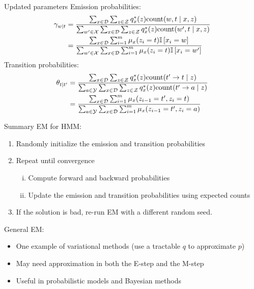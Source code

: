 \documentclass[usenames,dvipsnames,notes]{beamer}
\begin{document}
\begin{frame}
    {Updated parameters}
    Emission probabilities:
    \begin{align*}
        \gamma_{w\mid t} &= \frac{
            \sum_{x\in\mathcal{D}} \sum_{z\in\mathcal{Z}} q^*_x(z) \text{count}(w,t\mid x,z)
        }{
            \sum_{w'\in\mathcal{X}} \sum_{x\in\mathcal{D}} \sum_{z\in\mathcal{Z}} q^*_x(z) \text{count}(w',t\mid x,z)
        }\\
        &= \frac{
            \sum_{x\in\mathcal{D}} \sum_{i=1}^m \mu_x(z_i=t) \mathbb{I}\left[ x_i=w \right]
        }{
            \sum_{w'\in\mathcal{X}} \sum_{x\in\mathcal{D}} \sum_{i=1}^m \mu_x(z_i=t) \mathbb{I}\left[ x_i=w' \right]
        }
    \end{align*}
    Transition probabilities:
    \begin{align*}
        \theta_{t\mid t'} &= \frac{
            \sum_{x\in\mathcal{D}} \sum_{z\in\mathcal{Z}} q^*_x(z) \text{count}(t'\rightarrow t\mid z)
        }{
            \sum_{a\in\mathcal{Y}} \sum_{x\in\mathcal{D}} \sum_{z\in\mathcal{Z}} q^*_x(z) \text{count}(t'\rightarrow a\mid z)
        }\\
        &= \frac{
            \sum_{x\in\mathcal{D}}\sum_{i=1}^m \mu_x(z_{i-1}=t',z_i=t)
        }{
            \sum_{a\in\mathcal{Y}} \sum_{x\in\mathcal{D}}\sum_{i=1}^m \mu_x(z_{i-1}=t',z_i=a)
        }
    \end{align*}
\end{frame}

\begin{frame}
    {Summary}
    EM for HMM:\\
    \begin{enumerate}
        \item Randomly initialize the emission and transition probabilities
        \item Repeat until convergence
            \begin{enumerate}[(i)]
                \item Compute forward and backward probabilities
                \item Update the emission and transition probabilities using expected counts
            \end{enumerate}
        \item[] If the solution is bad, re-run EM with a different random seed.
    \end{enumerate}

    General EM:\\
    \begin{itemize}
        \item One example of variational methods (use a tractable $q$ to approximate $p$)
        \item May need approximation in both the E-step and the M-step
        \item Useful in probabilistic models and Bayesian methods
    \end{itemize}
\end{frame}
\end{document}
